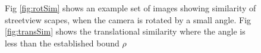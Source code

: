 \begin{figure}[t!]
	\centering
	\hspace*{-5mm}
	\vspace{-0.4cm}
	\caption{ Fig \ref{fig:rotSim} shows an example set of images showing similarity of streetview scapes, when the camera is rotated by a small angle. Fig \ref{fig:transSim} shows the translational similarity where the angle is less than the established bound $\rho$ }
	\vspace{-0.4cm}
\end{figure}

